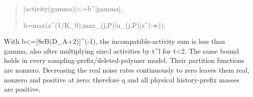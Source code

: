 \documentclass[
]{article}
\begin{document}
\begin{quote}\small\ttfamily\raggedright\setlength{\parskip}{0pt}
\noindent |\allowbreak{}a\allowbreak{}c\allowbreak{}t\allowbreak{}i\allowbreak{}v\allowbreak{}i\allowbreak{}t\allowbreak{}y\allowbreak{}(\allowbreak{}g\allowbreak{}a\allowbreak{}m\allowbreak{}m\allowbreak{}a\allowbreak{})\allowbreak{}|\allowbreak{}<\allowbreak{}=\allowbreak{}b\allowbreak{}\^{}\allowbreak{}|\allowbreak{}g\allowbreak{}a\allowbreak{}m\allowbreak{}m\allowbreak{}a\allowbreak{}|\allowbreak{},\par
\noindent b\allowbreak{}=\allowbreak{}m\allowbreak{}a\allowbreak{}x\allowbreak{}(\allowbreak{}z\allowbreak{}\^{}\allowbreak{}(\allowbreak{}1\allowbreak{}/\allowbreak{}K\allowbreak{}\_\allowbreak{}0\allowbreak{})\allowbreak{},\allowbreak{}\hspace*{0.525em}\allowbreak{}m\allowbreak{}a\allowbreak{}x\allowbreak{}\_\allowbreak{}(\allowbreak{}j\allowbreak{},\allowbreak{}P\allowbreak{})\allowbreak{}|\allowbreak{}u\allowbreak{}\_\allowbreak{}(\allowbreak{}j\allowbreak{},\allowbreak{}P\allowbreak{})\allowbreak{}|\allowbreak{}\hspace*{0.525em}\allowbreak{}z\allowbreak{}\^{}\allowbreak{}(\allowbreak{}-\allowbreak{}w\allowbreak{})\allowbreak{})\allowbreak{}.\par
\end{quote}

With
b\allowbreak{}<\allowbreak{}=\allowbreak{}[\allowbreak{}8\allowbreak{}e\allowbreak{}B\allowbreak{}(\allowbreak{}D\allowbreak{}\_\allowbreak{}A\allowbreak{}+\allowbreak{}2\allowbreak{})\allowbreak{}]\allowbreak{}\^{}\allowbreak{}(\allowbreak{}-\allowbreak{}1\allowbreak{})\allowbreak{},
the incompatible-activity sum is less than \textbar gamma\textbar, also
after multiplying size-l activities by t\^{}l for
\textbar t\textbar\textless2. The same bound holds in every
s\allowbreak{}a\allowbreak{}m\allowbreak{}p\allowbreak{}l\allowbreak{}i\allowbreak{}n\allowbreak{}g\allowbreak{}-\allowbreak{}p\allowbreak{}r\allowbreak{}e\allowbreak{}f\allowbreak{}i\allowbreak{}x\allowbreak{}/\allowbreak{}d\allowbreak{}e\allowbreak{}l\allowbreak{}e\allowbreak{}t\allowbreak{}e\allowbreak{}d\allowbreak{}-\allowbreak{}p\allowbreak{}o\allowbreak{}l\allowbreak{}y\allowbreak{}m\allowbreak{}e\allowbreak{}r
model. Their partition functions are nonzero. Decreasing the real noise
rates continuously to zero leaves them real, nonzero and positive at
zero; therefore q and all physical history-prefix masses are positive.
\end{document}

